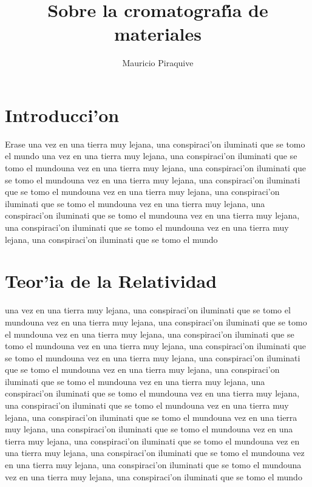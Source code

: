 \documentclass[spanish]{IEEEtran}
\title{Sobre la cromatograf\'{\i}a de materiales}
\author{Mauricio Piraquive}
\begin{document}

\maketitle
\section{Introducci'on}
Erase una vez en una tierra muy \cite{godel} lejana, una conspiraci'on iluminati que se tomo el mundo una vez en una tierra muy lejana, una conspiraci'on iluminati que se tomo el mundouna vez en una tierra muy lejana, una conspiraci'on iluminati que se tomo el mundouna vez en una tierra muy lejana, una conspiraci'on iluminati que se tomo el mundouna vez en una tierra muy lejana, una conspiraci'on iluminati que se tomo el mundouna vez en una tierra muy lejana, una conspiraci'on iluminati que se tomo el mundouna vez en una tierra muy lejana, una conspiraci'on iluminati que se tomo el mundouna vez en una tierra muy lejana, una conspiraci'on iluminati que se tomo el mundo
\section{Teor'ia de la Relatividad}
una vez en una tierra muy lejana, una conspiraci'on iluminati que se tomo el mundouna vez en una tierra muy lejana, una conspiraci'on iluminati que se tomo el mundouna vez en una tierra muy lejana, una conspiraci'on iluminati que se tomo el mundouna vez en una tierra muy lejana, una conspiraci'on iluminati que se tomo el mundouna vez en una tierra muy lejana, una conspiraci'on iluminati que se tomo el mundouna vez en una tierra muy lejana, una conspiraci'on iluminati que se tomo el mundouna vez en una tierra muy lejana, una conspiraci'on iluminati que se tomo el mundouna vez en una tierra muy lejana, una conspiraci'on iluminati que se tomo el mundouna vez en una tierra muy lejana, una conspiraci'on iluminati que se tomo el mundouna vez en una tierra muy lejana, una conspiraci'on iluminati que se tomo el mundouna vez en una tierra muy lejana, una conspiraci'on iluminati que se tomo el mundouna vez en una tierra muy lejana, una conspiraci'on iluminati que se tomo el mundouna vez en una tierra muy lejana, una conspiraci'on iluminati que se tomo el mundouna vez en una tierra muy lejana, una conspiraci'on iluminati que se tomo el mundo
\end{document}
